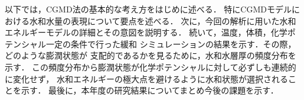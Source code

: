 以下では，CGMD法の基本的な考え方をはじめに述べる．
特にCGMDモデルにおける水和水量の表現について要点を述べる．
次に，今回の解析に用いた水和エネルギーモデルの詳細とその意図を説明する．
続いて，温度，体積，化学ポテンシャル一定の条件で行った緩和
シミュレーションの結果を示す．その際，どのような膨潤状態が
支配的であるかを見るために，水和水層厚の頻度分布を示す．
この頻度分布から膨潤状態が化学ポテンシャルに対して必ずしも連続的に変化せず，
水和エネルギーの極大点を避けるように水和状態が選択されることを示す．
最後に，本年度の研究結果についてまとめ今後の課題を示す．
